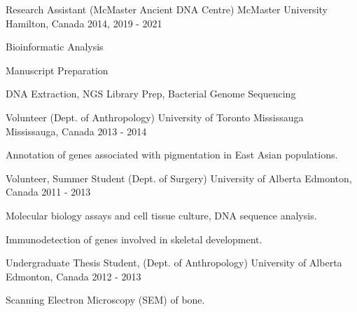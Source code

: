 \begin{cventries}
  \cventry
    { Research Assistant (McMaster Ancient DNA Centre)} %
    {McMaster University} %
    {Hamilton, Canada} %
    {2014,
    2019 - 2021} %
    {
      \begin{cvitems} %
        \item {Bioinformatic Analysis}
        \item {Manuscript Preparation}
        \item {DNA Extraction, NGS Library Prep, Bacterial Genome Sequencing}
      \end{cvitems}
    }
    

  \cventry
    {Volunteer (Dept. of Anthropology)} %
    {University of Toronto Mississauga} %
    {Mississauga, Canada} %
    {2013 - 2014} %
    {
      \begin{cvitems} %
        \item {Annotation of genes associated with pigmentation in East Asian populations.}
      \end{cvitems}
    }


  \cventry
    {Volunteer, Summer Student (Dept. of Surgery)} %
    {University of Alberta} %
    {Edmonton, Canada} %
    {2011 - 2013} %
    {
      \begin{cvitems} %
        \item {Molecular biology assays and cell tissue culture, DNA sequence analysis.}
        \item {Immunodetection of genes involved in skeletal development.}
      \end{cvitems}
    }


  \cventry
    {Undergraduate Thesis Student, (Dept. of Anthropology)} %
    {University of Alberta} %
    {Edmonton, Canada} %
    {2012 - 2013} %
    {
      \begin{cvitems} %
        \item {Scanning Electron Microscopy (SEM) of bone.}
      \end{cvitems}
    }

\end{cventries}

\pagebreak